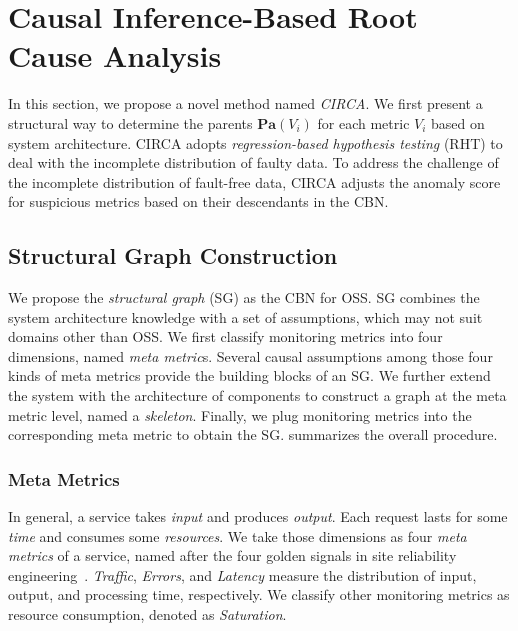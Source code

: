\section{Causal Inference-Based Root Cause Analysis}\label{sec:methodology}

In this section, we propose a novel method named \textit{CIRCA}.
We first present a structural way to determine the parents $\mathbf{Pa}(V_{i})$ for each metric $V_{i}$ based on system architecture.
CIRCA adopts \textit{regression-based hypothesis testing} (RHT) to deal with the incomplete distribution of faulty data.
To address the challenge of the incomplete distribution of fault-free data, CIRCA adjusts the anomaly score for suspicious metrics based on their descendants in the CBN.

\subsection{Structural Graph Construction}

We propose the \textit{structural graph} (SG) as the CBN for OSS.
SG combines the system architecture knowledge with a set of assumptions, which may not suit domains other than OSS.
We first classify monitoring metrics into four dimensions, named \textit{meta metric}s.
Several causal assumptions among those four kinds of meta metrics provide the building blocks of an SG.
We further extend the system with the architecture of components to construct a graph at the meta metric level, named a \textit{skeleton}.
Finally, we plug monitoring metrics into the corresponding meta metric to obtain the SG.
 summarizes the overall procedure.

\subsubsection{Meta Metrics}

In general, a service takes \textit{input} and produces \textit{output}.
Each request lasts for some \textit{time} and consumes some \textit{resources}.
We take those dimensions as four \textit{meta metrics} of a service, named after the four golden signals in site reliability engineering~\cite{Beyer:2016}.
\textit{Traffic}, \textit{Errors}, and \textit{Latency} measure the distribution of input, output, and processing time, respectively.
We classify other monitoring metrics as resource consumption, denoted as \textit{Saturation}.

